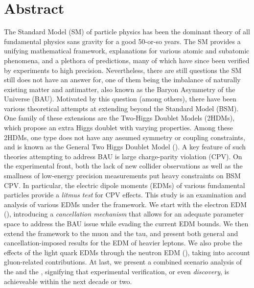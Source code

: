 \chapter{Abstract}
\label{ch:abstract}
The Standard Model (SM) of particle physics has been the dominant theory of all fundamental physics sans gravity for a good 50-or-so years.
The SM provides a unifying mathematical framework, explanations for various atomic and subatomic phenomena,
and a plethora of predictions, many of which have since been verified by experiments to high precision.
Nevertheless, there are still questions the SM still does not have an answer for, 
one of them being the imbalance of naturally existing matter and antimatter,
also known as the Baryon Asymmetry of the Universe (BAU).
Motivated by this question (among others), there have been various theoretical attempts at extending beyond the Standard Model (BSM).
One family of these extensions are the Two-Higgs Doublet Models (2HDMs), which propose an extra Higgs doublet with varying properties.
Among these 2HDMs, one type does not have any assumed symmetry or coupling constraints, and is known as the General Two Higgs Doublet Model ({\gthdm}).
A key feature of such theories attempting to address BAU is large charge-parity violation (CPV).
On the experimental front, both the lack of new collider observations as well as the smallness of low-energy precision measurements put heavy constraints on BSM CPV.
In particular, the electric dipole moments (EDMs) of various fundamental particles provide a \textit{litmus test} for CPV effects.
This study is an examination and analysis of various EDMs under the {\gthdm} framework. 
We start with the electron EDM ({\eedm}), introducing a \textit{cancellation mechanism} that allows for an adequate parameter space to address the BAU issue while evading the current EDM bounds.
We then extend the framework to the muon and the tau, and present both general and cancellation-imposed results for the EDM of heavier leptons.
We also probe the effects of the light quark EDMs through the neutron EDM ({\nedm}), taking into account gluon-related contributions.
At last, we present a combined scenario analysis of the {\eedm} and the {\nedm}, signifying that experimental verification, or even \textit{discovery}, is achieveable within the next decade or two.